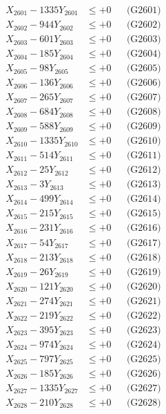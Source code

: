 \documentclass[a4paper,10pt]{article}
\begin{document}
{\begin{align}
\allowbreak
X_{2601} - 1335Y_{2601} &\leq +0 && \text{(G2601)} \\
X_{2602} - 944Y_{2602} &\leq +0 && \text{(G2602)} \\
X_{2603} - 601Y_{2603} &\leq +0 && \text{(G2603)} \\
X_{2604} - 185Y_{2604} &\leq +0 && \text{(G2604)} \\
X_{2605} - 98Y_{2605} &\leq +0 && \text{(G2605)} \\
X_{2606} - 136Y_{2606} &\leq +0 && \text{(G2606)} \\
X_{2607} - 265Y_{2607} &\leq +0 && \text{(G2607)} \\
X_{2608} - 684Y_{2608} &\leq +0 && \text{(G2608)} \\
X_{2609} - 588Y_{2609} &\leq +0 && \text{(G2609)} \\
X_{2610} - 1335Y_{2610} &\leq +0 && \text{(G2610)} \\
\allowbreak
X_{2611} - 514Y_{2611} &\leq +0 && \text{(G2611)} \\
X_{2612} - 25Y_{2612} &\leq +0 && \text{(G2612)} \\
X_{2613} - 3Y_{2613} &\leq +0 && \text{(G2613)} \\
X_{2614} - 499Y_{2614} &\leq +0 && \text{(G2614)} \\
X_{2615} - 215Y_{2615} &\leq +0 && \text{(G2615)} \\
X_{2616} - 231Y_{2616} &\leq +0 && \text{(G2616)} \\
X_{2617} - 54Y_{2617} &\leq +0 && \text{(G2617)} \\
X_{2618} - 213Y_{2618} &\leq +0 && \text{(G2618)} \\
X_{2619} - 26Y_{2619} &\leq +0 && \text{(G2619)} \\
X_{2620} - 121Y_{2620} &\leq +0 && \text{(G2620)} \\
\allowbreak
X_{2621} - 274Y_{2621} &\leq +0 && \text{(G2621)} \\
X_{2622} - 219Y_{2622} &\leq +0 && \text{(G2622)} \\
X_{2623} - 395Y_{2623} &\leq +0 && \text{(G2623)} \\
X_{2624} - 974Y_{2624} &\leq +0 && \text{(G2624)} \\
X_{2625} - 797Y_{2625} &\leq +0 && \text{(G2625)} \\
X_{2626} - 185Y_{2626} &\leq +0 && \text{(G2626)} \\
X_{2627} - 1335Y_{2627} &\leq +0 && \text{(G2627)} \\
X_{2628} - 210Y_{2628} &\leq +0 && \text{(G2628)} \\

\end{align}}
\end{document}
